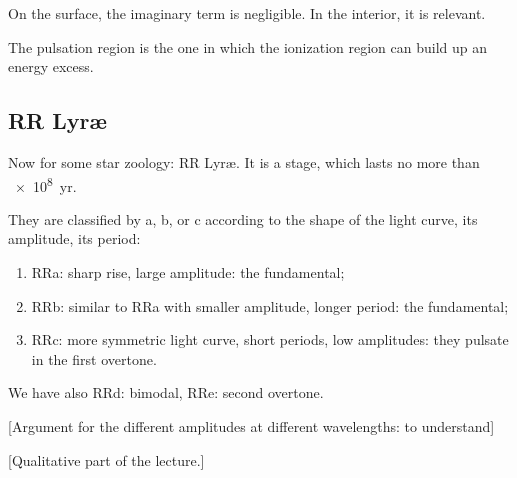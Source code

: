 \documentclass[main.tex]{subfiles}
\begin{document}
On the surface, the imaginary term is negligible. In the interior, it is relevant.

The pulsation region is the one in which the ionization region can build up an energy excess. 

\subsection{RR Lyr\ae}

Now for some star zoology: RR Lyr\ae.
It is a stage, which lasts no more than \SI{e8}{yr}.

They are classified by a, b, or c according to the shape of the light curve, its amplitude, its period:

\begin{enumerate}
  \item RRa: sharp rise, large amplitude: the fundamental;
  \item RRb: similar to RRa with smaller amplitude, longer period: the fundamental;
  \item RRc: more symmetric light curve, short periods, low amplitudes: they pulsate in the first overtone.
\end{enumerate}

We have also RRd: bimodal, RRe: second overtone.

[Argument for the different amplitudes at different wavelengths: to understand]

[Qualitative part of the lecture.]
\end{document}
